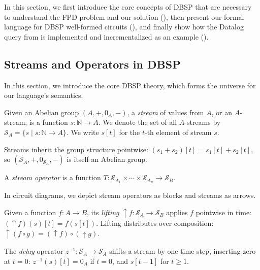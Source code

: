 %
In this section, we first introduce the core concepts of DBSP that are necessary to understand the FPD problem and our solution (), then present our formal language for DBSP well-formed circuits (), and finally show how the Datalog query from  is implemented and incrementalized as an example ().

\subsection{Streams and Operators in DBSP}\label{sec:pre-theory}
In this section, we introduce the core DBSP theory, which forms the universe for our language's semantics.

\begin{definition}[Stream]\label{def:stream}
Given an Abelian group $(A, +, 0_A, -)$, a \emph{stream} of values from $A$, or an $A$-stream, is a function $s : \mathbb{N} \to A$. We denote the set of all $A$-streams by $\mathcal{S}_A = \{ s \mid s : \mathbb{N} \to A \}$. We write $s[t]$ for the $t$-th element of stream $s$.
\end{definition}
Streams inherit the group structure pointwise: $(s_1 + s_2)[t] = s_1[t] + s_2[t]$, so $(\mathcal{S}_A, +, 0_{\mathcal{S}_A}, -)$ is itself an Abelian group.

\begin{definition}\label{def:stream-operator}
A \emph{stream operator} is a function $T : \mathcal{S}_{A_1} \times \cdots \times \mathcal{S}_{A_n} \to \mathcal{S}_B$.
\end{definition}

In circuit diagrams, we depict stream operators as blocks and streams as arrows.

\begin{definition}[Lifting]\label{def:lifting}
Given a function $f : A \to B$, its \emph{lifting} ${\uparrow} f : \mathcal{S}_A \to \mathcal{S}_B$ applies $f$ pointwise in time: $({\uparrow} f)(s)[t] = f(s[t])$. Lifting distributes over composition: ${\uparrow}(f \circ g) = ({\uparrow} f) \circ ({\uparrow} g)$.
\end{definition}

\begin{definition}[Delay]
The \emph{delay} operator $z^{-1} : \mathcal{S}_A \to \mathcal{S}_A$ shifts a stream by one time step, inserting zero at $t = 0$: $z^{-1}(s)[t] = 0_A$ if $t = 0$, and $s[t-1]$ for $t \geq 1$.
\end{definition}

